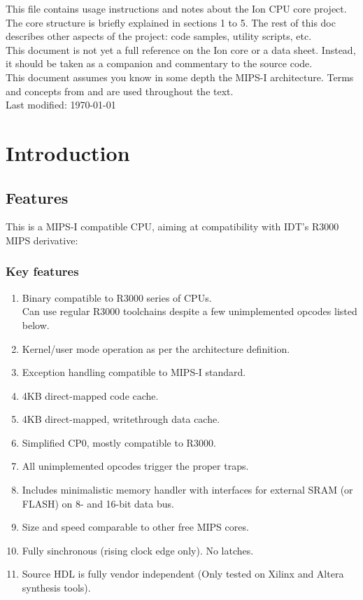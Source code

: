 \clearpage
This file contains usage instructions and notes about the Ion CPU core project.
The core structure is briefly explained in sections 1 to 5. The rest of this 
doc describes other aspects of the project: code samples, utility scripts, 
etc.\\

This document is not yet a full reference on the Ion core or a data sheet. 
Instead, it should be taken as a companion and commentary to the source code.\\

This document assumes you know in some depth the MIPS-I architecture. Terms and
concepts from \cite['See MIPS Run']{see_mips_run} and 
\cite['IDT R3K Reference Manual']{r3k_ref_man} are used throughout the text.\\

Last modified: \today
\clearpage

\chapter{Introduction}

\section{Features}
\label{features}

This is a MIPS-I compatible CPU, aiming at compatibility with IDT's R3000 
MIPS derivative:\\

\begin{framed}
\subsection{Key features}
\begin{enumerate}
    \item Binary compatible to R3000 series of CPUs.\\
        Can use regular R3000 toolchains despite a few unimplemented opcodes 
        listed below.
    \item Kernel/user mode operation as per the architecture definition.
    \item Exception handling compatible to MIPS-I standard.
    \item 4KB direct-mapped code cache.
    \item 4KB direct-mapped, writethrough data cache.
    \item Simplified CP0, mostly compatible to R3000.
    \item All unimplemented opcodes trigger the proper traps.
    \item Includes minimalistic memory handler with interfaces for external 
          SRAM (or FLASH) on 8- and 16-bit data bus.
    \item Size and speed comparable to other free MIPS cores.
    \item Fully sinchronous (rising clock edge only). No latches.
    \item Source HDL is fully vendor independent (Only tested on 
          Xilinx and Altera synthesis tools).
\end{enumerate}
\end{framed}


